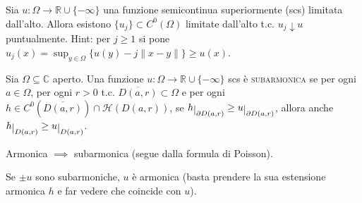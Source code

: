 \begin{exc}
  Sia $u: \Omega \longrightarrow \mathbb{R}\cup\{-\infty\}$ una funzione semicontinua superiormente (scs) limitata dall'alto. Allora esistono $\{u_j\} \subset C^0(\Omega)$ limitate dall'alto t.c. $u_j \downarrow u$ puntualmente. Hint: per $j \ge 1$ si pone $\displaystyle u_j(x)=\sup_{y \in \Omega} \{u(y)-j\|x-y\|\} \ge u(x)$.
\end{exc}

\begin{defn}
  Sia $\Omega \subseteq \mathbb{C}$ aperto. Una funzione $u: \Omega \longrightarrow \mathbb{R}\cup\{-\infty\}$ scs è \textsc{subarmonica} se per ogni $a \in \Omega$, per ogni $r>0$ t.c. $\overline{D(a,r)} \subset \Omega$ e per ogni $h \in C^0(\overline{D(a,r)})\cap \mathcal{H}(D(a,r))$, se $h\restrict{\partial D(a,r)} \ge u\restrict{\partial D(a,r)}$, allora anche $h\restrict{D(a,r)} \ge u \restrict{D(a,r)}$.
\end{defn}

\begin{oss}
  Armonica $\implies$ subarmonica (segue dalla formula di Poisson).
\end{oss}

\begin{oss}
  Se $\pm u$ sono subarmoniche, $u$ è armonica (basta prendere la sua estensione armonica $h$ e far vedere che coincide con $u$).
\end{oss}
